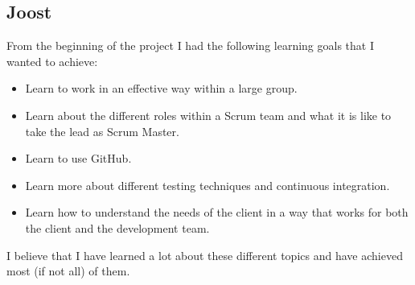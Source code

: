 \documentclass{article}
\begin{document}
\begin{enumerate}
\begin{itemize}
\subsection*{Joost}
From the beginning of the project I had the following learning goals that I wanted to achieve:
\begin{itemize}
	\item Learn to work in an effective way within a large group.
	\item Learn about the different roles within a Scrum team and what it is like to take the lead as Scrum Master.
	\item Learn to use GitHub.
	\item Learn more about different testing techniques and continuous integration.
	\item Learn how to understand the needs of the client in a way that works for both the client and the development team.
\end{itemize}


I believe that I have learned a lot about these different topics and have achieved most (if not all) of them.


\end{itemize}
\end{enumerate}
\end{document}
